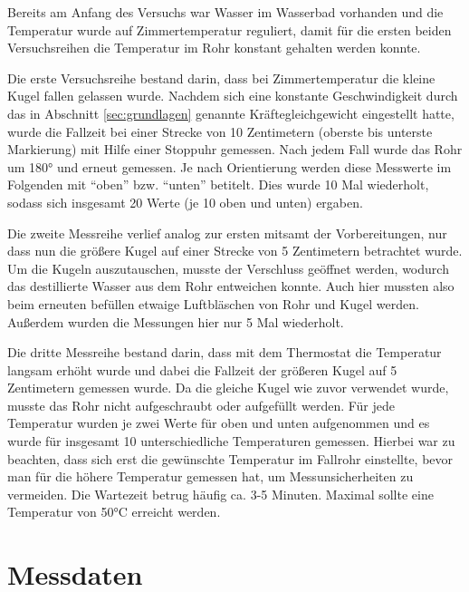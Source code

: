 Bereits am Anfang des Versuchs war Wasser im Wasserbad vorhanden und die Temperatur wurde auf Zimmertemperatur reguliert,
damit für die ersten beiden Versuchsreihen die Temperatur im Rohr konstant gehalten werden konnte.

Die erste Versuchsreihe bestand darin, dass bei Zimmertemperatur die kleine Kugel fallen gelassen wurde.
Nachdem sich eine konstante Geschwindigkeit durch das in Abschnitt \ref{sec:grundlagen} genannte Kräftegleichgewicht eingestellt hatte,
wurde die Fallzeit bei einer Strecke von 10 Zentimetern (oberste bis unterste Markierung)
mit Hilfe einer Stoppuhr gemessen.
Nach jedem Fall wurde das Rohr um 180° und erneut gemessen.
Je nach Orientierung werden diese Messwerte im Folgenden mit \enquote{oben} bzw. \enquote{unten} betitelt.
Dies wurde 10 Mal wiederholt, sodass sich insgesamt 20 Werte (je 10 oben und unten) ergaben.

Die zweite Messreihe verlief analog zur ersten mitsamt der Vorbereitungen, nur dass nun die größere Kugel auf einer Strecke von 5 Zentimetern betrachtet wurde.
Um die Kugeln auszutauschen, musste der Verschluss geöffnet werden, wodurch das destillierte Wasser aus dem Rohr entweichen konnte.
Auch hier mussten also beim erneuten befüllen etwaige Luftbläschen von Rohr und Kugel werden.
Außerdem wurden die Messungen hier nur 5 Mal wiederholt.

Die dritte Messreihe bestand darin, dass mit dem Thermostat die Temperatur langsam erhöht wurde
und dabei die Fallzeit der größeren Kugel auf 5 Zentimetern gemessen wurde.
Da die gleiche Kugel wie zuvor verwendet wurde, musste das Rohr nicht aufgeschraubt oder aufgefüllt werden.
Für jede Temperatur wurden je zwei Werte für oben und unten aufgenommen und es wurde für insgesamt 10 unterschiedliche Temperaturen gemessen.
Hierbei war zu beachten, dass sich erst die gewünschte Temperatur im Fallrohr einstellte, bevor man für die höhere Temperatur gemessen hat, 
um Messunsicherheiten zu vermeiden. Die Wartezeit betrug häufig ca. 3-5 Minuten. Maximal sollte eine Temperatur von 50°C erreicht werden.



\section{Messdaten}

